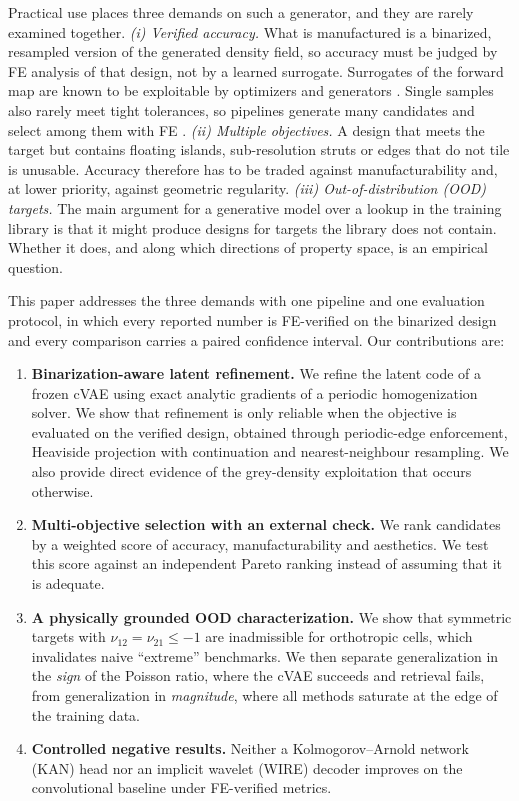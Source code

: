 \documentclass[a4paper,11pt]{article}
\newcommand{\nuot}{\nu_{12}}
\newcommand{\nuto}{\nu_{21}}
\begin{document}
Practical use places three demands on such a generator, and they are rarely
examined together.
\emph{(i) Verified accuracy.} What is manufactured is a binarized,
resampled version of the generated density field, so accuracy must be judged
by FE analysis of that design, not by a learned surrogate. Surrogates of the
forward map are known to be exploitable by optimizers and generators
\citep{trabucco2021coms}. Single samples also rarely meet tight tolerances,
so pipelines generate many candidates and select among them with FE
\citep{pahlavani2024deep}.
\emph{(ii) Multiple objectives.} A design that meets the target but contains
floating islands, sub-resolution struts or edges that do not tile is
unusable. Accuracy therefore has to be traded against manufacturability and,
at lower priority, against geometric regularity.
\emph{(iii) Out-of-distribution (OOD) targets.} The main argument for a
generative model over a lookup in the training library is that it might
produce designs for targets the library does not contain. Whether it does,
and along which directions of property space, is an empirical question.

This paper addresses the three demands with one pipeline and one evaluation
protocol, in which every reported number is FE-verified on the binarized
design and every comparison carries a paired confidence interval. Our
contributions are:
\begin{enumerate}
\item \textbf{Binarization-aware latent refinement.} We refine the latent
code of a frozen cVAE using exact analytic gradients of a periodic
homogenization solver. We show that refinement is only reliable when the
objective is evaluated on the verified design, obtained through periodic-edge
enforcement, Heaviside projection with continuation
\citep{guest2004achieving,wang2011projection} and nearest-neighbour
resampling. We also provide direct evidence of the grey-density exploitation
that occurs otherwise.
\item \textbf{Multi-objective selection with an external check.} We rank
candidates by a weighted score of accuracy, manufacturability and aesthetics.
We test this score against an independent Pareto ranking instead of assuming
that it is adequate.
\item \textbf{A physically grounded OOD characterization.} We show that
symmetric targets with $\nuot=\nuto\le-1$ are inadmissible for orthotropic
cells, which invalidates naive ``extreme'' benchmarks. We then separate
generalization in the \emph{sign} of the Poisson ratio, where the cVAE
succeeds and retrieval fails, from generalization in \emph{magnitude}, where
all methods saturate at the edge of the training data.
\item \textbf{Controlled negative results.} Neither a Kolmogorov--Arnold
network (KAN) head nor an implicit wavelet (WIRE) decoder improves on the
convolutional baseline under FE-verified metrics.
\end{enumerate}
\end{document}
